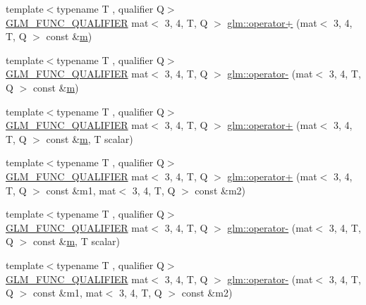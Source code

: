 \begin{DoxyCompactItemize}
\item 
{\footnotesize template$<$typename T , qualifier Q$>$ }\\\mbox{\hyperlink{setup_8hpp_a33fdea6f91c5f834105f7415e2a64407}{G\+L\+M\+\_\+\+F\+U\+N\+C\+\_\+\+Q\+U\+A\+L\+I\+F\+I\+ER}} mat$<$ 3, 4, T, Q $>$ \mbox{\hyperlink{namespaceglm_a80a5567c9ecbbec46155bf07f9d89ac8}{glm\+::operator+}} (mat$<$ 3, 4, T, Q $>$ const \&\mbox{\hyperlink{_s_d_l__opengl__glext_8h_af593500c283bf1a787a6f947f503a5c2}{m}})
\item 
{\footnotesize template$<$typename T , qualifier Q$>$ }\\\mbox{\hyperlink{setup_8hpp_a33fdea6f91c5f834105f7415e2a64407}{G\+L\+M\+\_\+\+F\+U\+N\+C\+\_\+\+Q\+U\+A\+L\+I\+F\+I\+ER}} mat$<$ 3, 4, T, Q $>$ \mbox{\hyperlink{namespaceglm_a79b94b30ab64f9fb5d7b6ebdaf29adab}{glm\+::operator-\/}} (mat$<$ 3, 4, T, Q $>$ const \&\mbox{\hyperlink{_s_d_l__opengl__glext_8h_af593500c283bf1a787a6f947f503a5c2}{m}})
\item 
{\footnotesize template$<$typename T , qualifier Q$>$ }\\\mbox{\hyperlink{setup_8hpp_a33fdea6f91c5f834105f7415e2a64407}{G\+L\+M\+\_\+\+F\+U\+N\+C\+\_\+\+Q\+U\+A\+L\+I\+F\+I\+ER}} mat$<$ 3, 4, T, Q $>$ \mbox{\hyperlink{namespaceglm_a1a8b82f43c87f6cfba909facca9c04b7}{glm\+::operator+}} (mat$<$ 3, 4, T, Q $>$ const \&\mbox{\hyperlink{_s_d_l__opengl__glext_8h_af593500c283bf1a787a6f947f503a5c2}{m}}, T scalar)
\item 
{\footnotesize template$<$typename T , qualifier Q$>$ }\\\mbox{\hyperlink{setup_8hpp_a33fdea6f91c5f834105f7415e2a64407}{G\+L\+M\+\_\+\+F\+U\+N\+C\+\_\+\+Q\+U\+A\+L\+I\+F\+I\+ER}} mat$<$ 3, 4, T, Q $>$ \mbox{\hyperlink{namespaceglm_a59ca098cc308f717e9036bbfd62de33f}{glm\+::operator+}} (mat$<$ 3, 4, T, Q $>$ const \&m1, mat$<$ 3, 4, T, Q $>$ const \&m2)
\item 
{\footnotesize template$<$typename T , qualifier Q$>$ }\\\mbox{\hyperlink{setup_8hpp_a33fdea6f91c5f834105f7415e2a64407}{G\+L\+M\+\_\+\+F\+U\+N\+C\+\_\+\+Q\+U\+A\+L\+I\+F\+I\+ER}} mat$<$ 3, 4, T, Q $>$ \mbox{\hyperlink{namespaceglm_abd4b7d952364922e319f2c3240a6f799}{glm\+::operator-\/}} (mat$<$ 3, 4, T, Q $>$ const \&\mbox{\hyperlink{_s_d_l__opengl__glext_8h_af593500c283bf1a787a6f947f503a5c2}{m}}, T scalar)
\item 
{\footnotesize template$<$typename T , qualifier Q$>$ }\\\mbox{\hyperlink{setup_8hpp_a33fdea6f91c5f834105f7415e2a64407}{G\+L\+M\+\_\+\+F\+U\+N\+C\+\_\+\+Q\+U\+A\+L\+I\+F\+I\+ER}} mat$<$ 3, 4, T, Q $>$ \mbox{\hyperlink{namespaceglm_a3317241e4c66b496f9578fb97a96dff8}{glm\+::operator-\/}} (mat$<$ 3, 4, T, Q $>$ const \&m1, mat$<$ 3, 4, T, Q $>$ const \&m2)

\end{DoxyCompactItemize}
